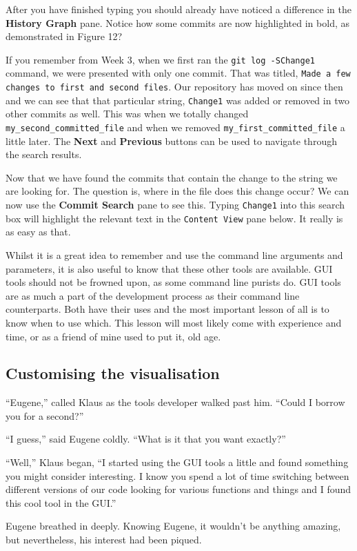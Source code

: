 
After you have finished typing you should already have noticed a difference in the \textbf{History Graph} pane.
Notice how some commits are now highlighted in bold, as demonstrated in Figure 12?


If you remember from Week 3, when we first ran the \texttt{git log -SChange1} command, we were presented with only one commit.
That was titled, \texttt{Made a few changes to first and second files}.
Our repository has moved on since then and we can see that that particular string, \texttt{Change1} was added or removed in two other commits as well.
This was when we totally changed \texttt{my\_second\_committed\_file} and when we removed \texttt{my\_first\_committed\_file} a little later.
The \textbf{Next} and \textbf{Previous} buttons can be used to navigate through the search results.

Now that we have found the commits that contain the change to the string we are looking for.
The question is, where in the file does this change occur? We can now use the \textbf{Commit Search} pane to see this.
Typing \texttt{Change1} into this search box will highlight the relevant text in the \texttt{Content View} pane below.
It really is as easy as that.

Whilst it is a great idea to remember and use the command line arguments and parameters, it is also useful to know that these other tools are available.
GUI tools should not be frowned upon, as some command line purists do.
GUI tools are as much a part of the development process as their command line counterparts.
Both have their uses and the most important lesson of all is to know when to use which.
This lesson will most likely come with experience and time, or as a friend of mine used to put it, old age.

\subsection{Customising the visualisation}

\begin{trenches}
``Eugene,'' called Klaus as the tools developer walked past him.
``Could I borrow you for a second?''

``I guess,'' said Eugene coldly.
``What is it that you want exactly?''

``Well,'' Klaus began,
``I started using the GUI tools a little and found something you might consider interesting. I know you spend a lot of time switching between different versions of our code looking for various functions and things and I found this cool tool in the GUI.''

Eugene breathed in deeply.
Knowing Eugene, it wouldn't be anything amazing, but nevertheless, his interest had been piqued.
\end{trenches}

